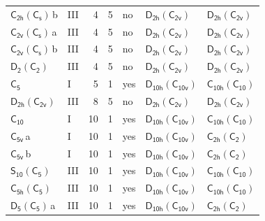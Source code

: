 \documentclass[10pt,a4paper]{article}
\numberwithin{equation}{section}
\newcommand{\grp}[1]{\mathsf{#1}}
\newcommand{\clsletter}[1]{\,{\scriptsize\color{black!55}#1}}
\begin{document}
{\begin{longtable}{@{}llrrlll@{}}
\href{C2h-C1v.pdf}{$\grp{C_{2h}}(\grp{C_{s}})$}\clsletter{b} & III & 4 & 5 & no & \href{D2h-C2v.pdf}{$\grp{D_{2h}}(\grp{C_{2v}})$} & \href{D2h-C2v.pdf}{$\grp{D_{2h}}(\grp{C_{2v}})$}\\
\href{C2v-C1v.pdf}{$\grp{C_{2v}}(\grp{C_{s}})$}\clsletter{a} & III & 4 & 5 & no & \href{D2h-C2v.pdf}{$\grp{D_{2h}}(\grp{C_{2v}})$} & \href{D2h-C2v.pdf}{$\grp{D_{2h}}(\grp{C_{2v}})$}\\
\href{C2v-C1v.pdf}{$\grp{C_{2v}}(\grp{C_{s}})$}\clsletter{b} & III & 4 & 5 & no & \href{D2h-C2v.pdf}{$\grp{D_{2h}}(\grp{C_{2v}})$} & \href{D2h-C2v.pdf}{$\grp{D_{2h}}(\grp{C_{2v}})$}\\
\href{D2-C2.pdf}{$\grp{D_{2}}(\grp{C_{2}})$} & III & 4 & 5 & no & \href{D2h-C2v.pdf}{$\grp{D_{2h}}(\grp{C_{2v}})$} & \href{D2h-C2v.pdf}{$\grp{D_{2h}}(\grp{C_{2v}})$}\\
\href{../../../rotation/data/pdf/C5.pdf}{$\grp{C_{5}}$} & I & 5 & 1 & yes & \href{D10h-C10v.pdf}{$\grp{D_{10h}}(\grp{C_{10v}})$} & \href{C10h-C10.pdf}{$\grp{C_{10h}}(\grp{C_{10}})$}\\
\href{D2h-C2v.pdf}{$\grp{D_{2h}}(\grp{C_{2v}})$} & III & 8 & 5 & no & \href{D2h-C2v.pdf}{$\grp{D_{2h}}(\grp{C_{2v}})$} & \href{D2h-C2v.pdf}{$\grp{D_{2h}}(\grp{C_{2v}})$}\\
\href{../../../rotation/data/pdf/C10.pdf}{$\grp{C_{10}}$} & I & 10 & 1 & yes & \href{D10h-C10v.pdf}{$\grp{D_{10h}}(\grp{C_{10v}})$} & \href{C10h-C10.pdf}{$\grp{C_{10h}}(\grp{C_{10}})$}\\
\href{../../../rotation/data/pdf/C5v.pdf}{$\grp{C_{5v}}$}\clsletter{a} & I & 10 & 1 & yes & \href{D10h-C10v.pdf}{$\grp{D_{10h}}(\grp{C_{10v}})$} & \href{C2h-C2.pdf}{$\grp{C_{2h}}(\grp{C_{2}})$}\\
\href{../../../rotation/data/pdf/C5v.pdf}{$\grp{C_{5v}}$}\clsletter{b} & I & 10 & 1 & yes & \href{D10h-C10v.pdf}{$\grp{D_{10h}}(\grp{C_{10v}})$} & \href{C2h-C2.pdf}{$\grp{C_{2h}}(\grp{C_{2}})$}\\
\href{S10-C5.pdf}{$\grp{S_{10}}(\grp{C_{5}})$} & III & 10 & 1 & yes & \href{D10h-C10v.pdf}{$\grp{D_{10h}}(\grp{C_{10v}})$} & \href{C10h-C10.pdf}{$\grp{C_{10h}}(\grp{C_{10}})$}\\
\href{C5h-C5.pdf}{$\grp{C_{5h}}(\grp{C_{5}})$} & III & 10 & 1 & yes & \href{D10h-C10v.pdf}{$\grp{D_{10h}}(\grp{C_{10v}})$} & \href{C10h-C10.pdf}{$\grp{C_{10h}}(\grp{C_{10}})$}\\
\href{D5-C5.pdf}{$\grp{D_{5}}(\grp{C_{5}})$}\clsletter{a} & III & 10 & 1 & yes & \href{D10h-C10v.pdf}{$\grp{D_{10h}}(\grp{C_{10v}})$} & \href{C2h-C2.pdf}{$\grp{C_{2h}}(\grp{C_{2}})$}\\

\end{longtable}}
\end{document}
